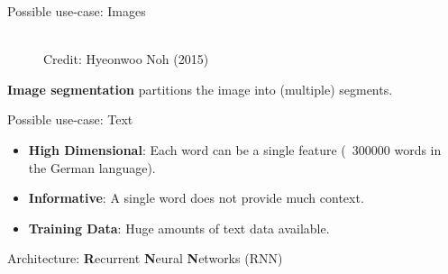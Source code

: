\begin{frame} {Possible use-case: Images}
\begin{figure}
\centering
{}
\\
\tiny{Credit: Hyeonwoo Noh (2015)} 
\end{figure}
\textbf{Image segmentation} partitions the image into (multiple) segments.
\end{frame}

\begin{frame} {Possible use-case: Text}
\begin{itemize}
\item \textbf{High Dimensional}: Each word can be a single feature (~300000 words in the German language).
\vspace{.1cm}
\item \textbf{Informative}: A single word does not provide much context.
\vspace{.1cm}
\item \textbf{Training Data}: Huge amounts of text data available.
\end{itemize}
\vspace{.3cm}
Architecture: \textbf{R}ecurrent \textbf{N}eural \textbf{N}etworks (RNN)
\begin{figure}
\centering
{}
\end{figure}
\end{frame}

